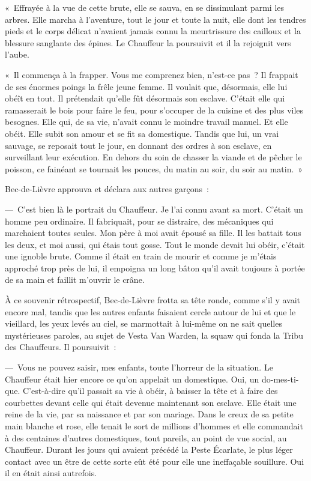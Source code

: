 \documentclass[french,twoside]{book} %
\begin{document}
« Effrayée à la vue de cette brute, elle se sauva, en se dissimulant parmi les arbres. Elle marcha à l’aventure, tout le jour et toute la nuit, elle dont les tendres pieds et le corps délicat n’avaient jamais connu la meurtrissure des cailloux et la blessure sanglante des épines. Le Chauffeur la poursuivit et il la rejoignit vers l’aube.\par
« Il commença à la frapper. Vous me comprenez bien, n’est-ce pas ? Il frappait de ses énormes poings la frêle jeune femme. Il voulait que, désormais, elle lui obéît en tout. Il prétendait qu’elle fût désormais son esclave. C’était elle qui ramasserait le bois pour faire le feu, pour s’occuper de la cuisine et des plus viles besognes. Elle qui, de sa vie, n’avait connu le moindre travail manuel. Et elle obéit. Elle subit son amour et se fit sa domestique. Tandis que lui, un vrai sauvage, se reposait tout le jour, en donnant des ordres à son esclave, en surveillant leur exécution. En dehors du soin de chasser la viande et de pêcher le poisson, ce fainéant se tournait les pouces, du matin au soir, du soir au matin. »\par
Bec-de-Lièvre approuva et déclara aux autres garçons :\par
— C’est bien là le portrait du Chauffeur. Je l’ai connu avant sa mort. C’était un homme peu ordinaire. Il fabriquait, pour se distraire, des mécaniques qui marchaient toutes seules. Mon père à moi avait épousé sa fille. Il les battait tous les deux, et moi aussi, qui étais tout gosse. Tout le monde devait lui obéir, c’était une ignoble brute. Comme il était en train de mourir et comme je m’étais approché trop près de lui, il empoigna un long bâton qu’il avait toujours à portée de sa main et faillit m’ouvrir le crâne.\par
À ce souvenir rétrospectif, Bec-de-Lièvre frotta sa tête ronde, comme s’il y avait encore mal, tandis que les autres enfants faisaient cercle autour de lui et que le vieillard, les yeux levés au ciel, se marmottait à lui-même on ne sait quelles mystérieuses paroles, au sujet de Vesta Van Warden, la squaw qui fonda la Tribu des Chauffeurs. Il poursuivit :\par
— Vous ne pouvez saisir, mes enfants, toute l’horreur de la situation. Le Chauffeur était hier encore ce qu’on appelait un domestique. Oui, un do-mes-ti-que. C’est-à-dire qu’il passait sa vie à obéir, à baisser la tête et à faire des courbettes devant celle qui était devenue maintenant son esclave. Elle était une reine de la vie, par sa naissance et par son mariage. Dans le creux de sa petite main blanche et rose, elle tenait le sort de millions d’hommes et elle commandait à des centaines d’autres domestiques, tout pareils, au point de vue social, au Chauffeur. Durant les jours qui avaient précédé la Peste Écarlate, le plus léger contact avec un être de cette sorte eût été pour elle une ineffaçable souillure. Oui il en était ainsi autrefois.\par
\end{document}

